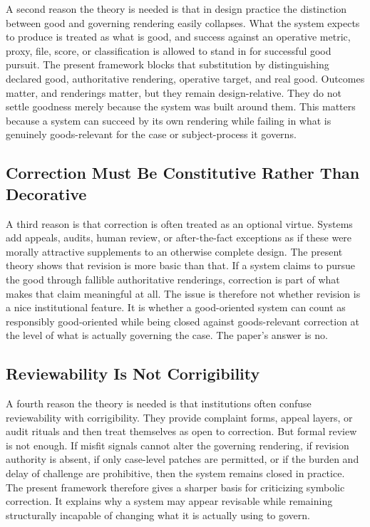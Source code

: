 \documentclass[11pt]{article}
\begin{document}
A second reason the theory is needed is that in design practice the distinction between good and governing rendering easily collapses. What the system expects to produce is treated as what is good, and success against an operative metric, proxy, file, score, or classification is allowed to stand in for successful good pursuit. The present framework blocks that substitution by distinguishing declared good, authoritative rendering, operative target, and real good. Outcomes matter, and renderings matter, but they remain design-relative. They do not settle goodness merely because the system was built around them. This matters because a system can succeed by its own rendering while failing in what is genuinely goods-relevant for the case or subject-process it governs.

\subsection{Correction Must Be Constitutive Rather Than Decorative}

A third reason is that correction is often treated as an optional virtue. Systems add appeals, audits, human review, or after-the-fact exceptions as if these were morally attractive supplements to an otherwise complete design. The present theory shows that revision is more basic than that. If a system claims to pursue the good through fallible authoritative renderings, correction is part of what makes that claim meaningful at all. The issue is therefore not whether revision is a nice institutional feature. It is whether a good-oriented system can count as responsibly good-oriented while being closed against goods-relevant correction at the level of what is actually governing the case. The paper's answer is no.

\subsection{Reviewability Is Not Corrigibility}

A fourth reason the theory is needed is that institutions often confuse reviewability with corrigibility. They provide complaint forms, appeal layers, or audit rituals and then treat themselves as open to correction. But formal review is not enough. If misfit signals cannot alter the governing rendering, if revision authority is absent, if only case-level patches are permitted, or if the burden and delay of challenge are prohibitive, then the system remains closed in practice.\cite{MoynihanHerdHarvey2015AdministrativeBurden,Eubanks2018AutomatingInequality} The present framework therefore gives a sharper basis for criticizing symbolic correction. It explains why a system may appear revisable while remaining structurally incapable of changing what it is actually using to govern.
\end{document}
